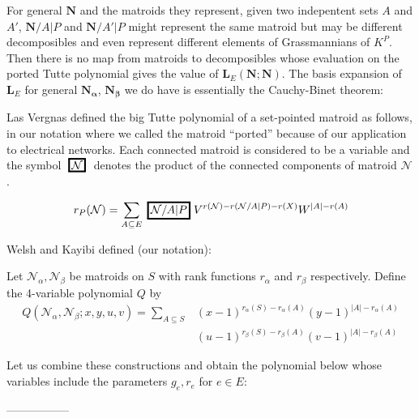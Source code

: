 \documentclass[Unicode]{cedram-alco}
\newcommand{\MVar}[1]{
  \setlength\fboxrule{1.5pt}
  \setlength\fboxsep{1.5pt}
  {\;\framebox{\ensuremath{#1}}\;}}
\newcommand{\ext}[1]{\ensuremath{\mathbf{#1}}}
\begin{document}
For general $\ext{N}$ and the matroids they represent, given two indepentent sets $A$ and $A'$,
$\ext{N}/A|P$ and $\ext{N}/A'|P$ might represent the same matroid but may be
different decomposibles and even represent different elements of Grassmannians of $K^{P}$.
Then there is no map from matroids to decomposibles whose evaluation on the ported
Tutte polynomial gives the value of $\ext{L}_E( \ext{N} ; \ext{N} )$.  The basis
expansion of $\ext{L}_E$ for general $\ext{N_\alpha}$, $\ext{N_\beta}$ we do have is
essentially the Cauchy-Binet theorem:


Las Vergnas defined the big Tutte polynomial\cite{} of a set-pointed matroid
as follows, in our notation\cite{} where we called the matroid ``ported''
because of our application to electrical networks.  Each connected matroid
is considered to be a variable and the symbol $\MVar{\mathcal{N}}$ denotes
the product of the connected components of matroid $\mathcal{N}$.

\begin{equation}
  r_{P}(\mathcal{N}) = \sum_{A\subseteq E}\MVar{\mathcal{N}/A|P}
  V^{r(\mathcal{N}) - r(\mathcal{N}/A|P) -r(X)}
  W^{|A|-r(A)}
\end{equation}



Welsh and Kayibi\cite{WelshKayibiLinking} defined (our notation):
\begin{defi}
  Let $\mathcal{N}_\alpha, \mathcal{N}_\beta$ be matroids on $S$ with rank
  functions $r_\alpha$ and $r_\beta$ respectively.  Define the 4-variable
  polynomial $Q$ by
  \begin{equation}
\begin{split}
    Q(\mathcal{N}_\alpha, \mathcal{N}_\beta;x, y, u, v) =
  \sum_{A\subseteq S}
  &(x-1)^{r_\alpha(S)-r_\alpha(A)}
  (y-1)^{|A|-r_\alpha(A)}       \\
  &(u-1)^{r_\beta(S)-r_\beta(A)}
  (v-1)^{|A|-r_\beta(A)}
\end{split}
  \end{equation}
\end{defi}


Let us combine these constructions and obtain the polynomial below whose
variables include the parameters $g_e, r_e$ for $e\in E$:



-----------------
\end{document}
